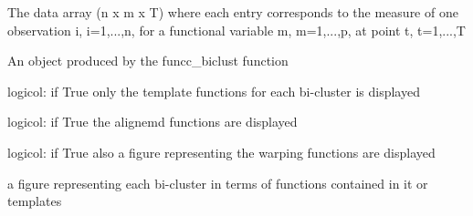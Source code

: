 \documentclass[a4paper]{book}
\begin{document}
\begin{Arguments}
\begin{ldescription}
\item[\code{fun\_mat}] The data array (n x m x T) where each entry corresponds to the measure of one observation i, i=1,...,n, for a functional variable m, m=1,...,p, at point t, t=1,...,T

\item[\code{res\_input}] An object produced by the funcc\_biclust function

\item[\code{only.mean}] logicol: if True only the template functions for each bi-cluster is displayed

\item[\code{aligned}] logicol: if True the alignemd functions are displayed

\item[\code{warping}] logicol: if True also a figure representing the warping functions are displayed
\end{ldescription}
\end{Arguments}
%
\begin{Value}
a figure representing each bi-cluster in terms of functions contained in it or templates
\end{Value}
\printindex{}
\end{document}
